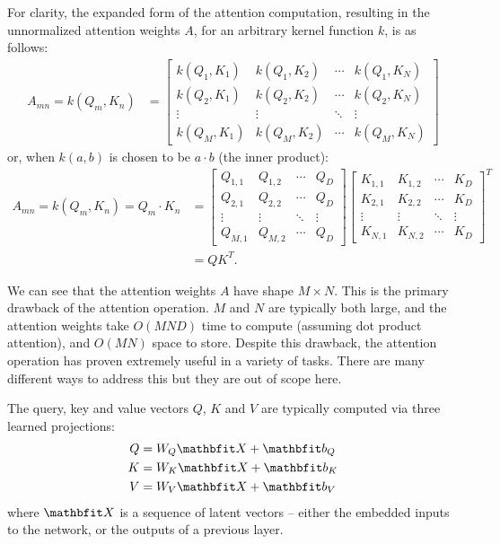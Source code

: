 For clarity, the expanded form of the attention computation, resulting in the unnormalized attention weights $A$, for an arbitrary kernel function $k$, is as follows:
\begin{align*}
A_{mn} = k(Q_m, K_n)
&= \begin{bmatrix}
    k(Q_{1}, K_{1}) & k(Q_{1}, K_{2}) & \cdots & k(Q_{1}, K_{N}) \\
    k(Q_{2}, K_{1}) & k(Q_{2}, K_{2}) & \cdots & k(Q_{2}, K_{N}) \\
    \vdots & \vdots & \ddots & \vdots \\
    k(Q_{M}, K_{1}) & k(Q_{M}, K_{2}) & \cdots & k(Q_{M}, K_{N})
\end{bmatrix}
\end{align*}
or, when $k(a, b)$ is chosen to be $a \cdot b$ (the inner product):
\begin{align*}
A_{mn} = k(Q_m, K_n) = Q_m \cdot K_n
&= \begin{bmatrix}
    Q_{1,1} & Q_{1,2} & \cdots & Q_D \\
    Q_{2,1} & Q_{2,2} & \cdots & Q_D \\
    \vdots & \vdots & \ddots & \vdots \\
    Q_{M,1} & Q_{M,2} & \cdots & Q_D
\end{bmatrix} \begin{bmatrix}
    K_{1,1} & K_{1,2} & \cdots & K_D \\
    K_{2,1} & K_{2,2} & \cdots & K_D \\
    \vdots & \vdots & \ddots & \vdots \\
    K_{N,1} & K_{N,2} & \cdots & K_D
\end{bmatrix}^T \\
&= Q K^T .
\end{align*}

We can see that the attention weights $A$ have shape $M×N$. This is the primary drawback of the attention operation. $M$ and $N$ are typically both large, and the attention weights take $O(MND)$ time to compute (assuming dot product attention), and $O(MN)$ space to store. Despite this drawback, the attention operation has proven extremely useful in a variety of tasks. There are many different ways to address this but they are out of scope here.

The query, key and value vectors $Q$, $K$ and $V$ are typically computed via three learned projections:
\begin{align}
\begin{aligned}
\label{eqn:attn-linear}
Q &= W_{Q} \X + \vb_{Q} \\
K &= W_{K} \X + \vb_{K} \\
V &= W_{V} \X + \vb_{V}
\end{aligned}
\end{align}
where $\X$ is a sequence of latent vectors -- either the embedded inputs to the network, or the outputs of a previous layer.

